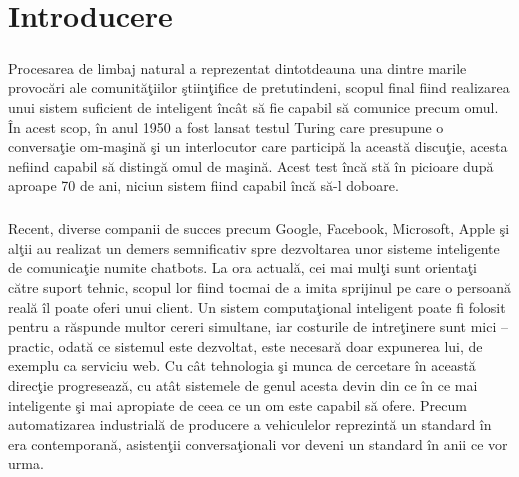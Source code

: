 \chapter{Introducere}

\paragraph{}
Procesarea de limbaj natural a reprezentat dintotdeauna una dintre marile provoc\u ari ale comunit\u a\c tiilor \c stiin\c tifice de pretutindeni, scopul final fiind realizarea unui sistem suficient de inteligent \^ inc\^ at s\u a fie capabil s\u a comunice precum omul. \^ In acest scop, \^ in anul 1950 a fost lansat testul Turing care presupune o conversa\c tie om-ma\c sin\u a \c si un interlocutor care particip\u a la aceast\u a discu\c tie, acesta nefiind capabil s\u a disting\u a omul de ma\c sin\u a. Acest test \^ inc\u a st\u a \^ in picioare dup\u a aproape 70 de ani, niciun sistem fiind capabil \^ inc\u a s\u a-l doboare. 

\paragraph{}
Recent, diverse companii de succes precum Google, Facebook, Microsoft, Apple \c si al\c tii au realizat un demers semnificativ spre dezvoltarea unor sisteme inteligente de comunica\c tie numite chatbots. La ora actual\u a, cei mai mul\c ti sunt orienta\c ti c\u atre suport tehnic, scopul lor fiind tocmai de a imita sprijinul pe care o persoan\u a real\u a \^ il poate oferi unui client. Un sistem computa\c tional inteligent poate fi folosit pentru a r\u aspunde multor cereri simultane, iar costurile de intre\c tinere sunt mici – practic, odat\u a ce sistemul este dezvoltat, este necesar\u a doar expunerea lui, de exemplu ca serviciu web. Cu c\^ at tehnologia \c si munca de cercetare \^ in aceast\u a direc\c tie progreseaz\u a, cu at\^ at sistemele de genul acesta devin din ce \^ in ce mai inteligente \c si mai apropiate de ceea ce un om este capabil s\u a ofere. Precum automatizarea industrial\u a de producere a vehiculelor reprezint\u a un standard \^ in era contemporan\u a, asisten\c tii conversa\c tionali vor deveni un standard \^ in anii ce vor urma.

